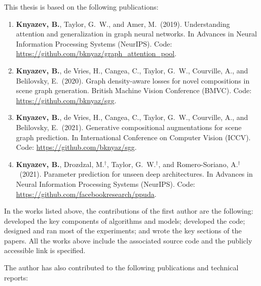\noindent This thesis is based on the following publications:

\begin{enumerate}
    \item \textbf{Knyazev, B.}, Taylor, G.~W., and Amer, M.~(2019). Understanding attention and generalization in graph neural networks. In Advances in Neural Information Processing Systems (NeurIPS). Code: \url{https://github.com/bknyaz/graph_attention_pool}.
    
    
    
    \item \textbf{Knyazev, B.}, de Vries, H., Cangea, C., Taylor, G.~W., Courville, A., and Belilovsky, E.~(2020). Graph density-aware losses for novel compositions in scene graph generation. British Machine Vision Conference (BMVC). 
    Code: \url{https://github.com/bknyaz/sgg}.
    
    \item \textbf{Knyazev, B.}, de Vries, H., Cangea, C., Taylor, G.~W., Courville, A., and Belilovsky, E.~(2021). Generative compositional augmentations for scene graph prediction. In International Conference on Computer Vision (ICCV). 
    Code: \url{https://github.com/bknyaz/sgg}.
    
    \item \textbf{Knyazev, B.}, Drozdzal, M.$^\dagger$, Taylor, G.~W.$^\dagger$, and Romero-Soriano, A.$^\dagger$~(2021). Parameter prediction for unseen deep architectures. In Advances in Neural Information Processing Systems (NeurIPS).
    Code: \url{https://github.com/facebookresearch/ppuda}.
\end{enumerate}

In the works listed above, the contributions of the first author are the following: developed the key components of algorithms and models; developed the code; designed and ran most of the experiments; and wrote the key sections of the papers. All the works above include the associated source code and the publicly accessible link is specified.

\vspace{18pt}
\noindent The author has also contributed to the following publications and technical reports:

